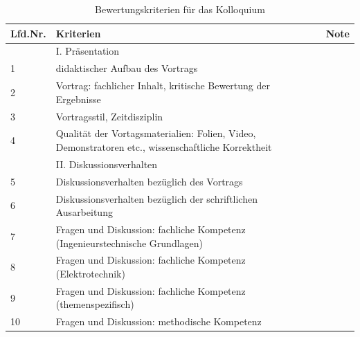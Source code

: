 \begin{table}[!h]
\centering
\begin{tabular}{ |p{1cm}|p{9cm}|p{0.7cm}|  }
 \hline
 Lfd.Nr.&Kriterien&Note \\  
\hline\hline
& I. Präsentation&\\
\hline
1   &didaktischer Aufbau des Vortrags&\\
\hline
2   &Vortrag: fachlicher Inhalt, kritische Bewertung der Ergebnisse&\\
\hline
3   &Vortragsstil, Zeitdisziplin&\\
\hline
4   &Qualität der Vortagsmaterialien: Folien, Video, Demonstratoren etc., wissenschaftliche Korrektheit&\\
\hline
& II. Diskussionsverhalten&\\
\hline
5   &Diskussionsverhalten bezüglich des Vortrags&\\
\hline
6   &Diskussionsverhalten bezüglich der schriftlichen Ausarbeitung&\\
\hline
7   &Fragen und Diskussion: fachliche Kompetenz (Ingenieurstechnische Grundlagen)&\\
\hline
8   &Fragen und Diskussion: fachliche Kompetenz (Elektrotechnik)&\\
\hline
9   &Fragen und Diskussion: fachliche Kompetenz (themenspezifisch)&\\
\hline 
10  &Fragen und Diskussion: methodische Kompetenz&\\
\hline
\end{tabular}
\caption{Bewertungskriterien für das Kolloquium}
\label{tab:kolloquium}
\end{table}



